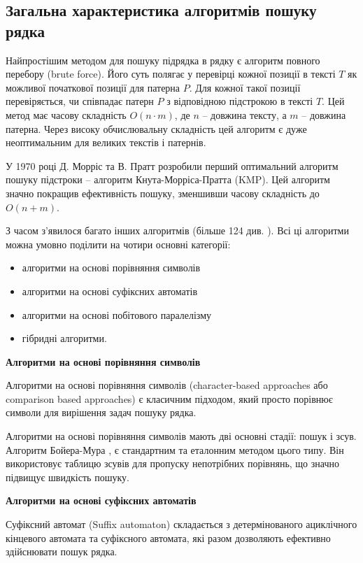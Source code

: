\documentclass[a4paper,14pt]{extarticle} %
\begin{document}
	\subsection{Загальна характеристика алгоритмів пошуку рядка}

	Найпростішим методом для пошуку підрядка в рядку є алгоритм повного перебору (brute force). Його суть полягає у перевірці кожної позиції в тексті \( T \) як можливої початкової позиції для патерна \( P \). Для кожної такої позиції перевіряється, чи співпадає патерн \( P \) з відповідною підстрокою в тексті \( T \). Цей метод має часову складність \( O(n \cdot m) \), де \( n \) – довжина тексту, а \( m \) – довжина патерна. Через високу обчислювальну складність цей алгоритм є дуже неоптимальним для великих текстів і патернів.

	У 1970 році Д. Морріс та В. Пратт \cite{morris-pratt} розробили перший оптимальний алгоритм пошуку підстроки – алгоритм Кнута-Морріса-Пратта (KMP). Цей алгоритм значно покращив ефективність пошуку, зменшивши часову складність до \( O(n + m) \).

	З часом з'явилося багато інших алгоритмів (більше 124 див. \cite{smart}). Всі ці алгоритми можна умовно поділити на чотири основні категорії:
	\begin{itemize}
		\item алгоритми на основі порівняння символів
		\item  алгоритми на основі суфіксних автоматів
		\item алгоритми на основі побітового паралелізму
		\item гібридні алгоритми.
	\end{itemize}

\textbf{Алгоритми на основі порівняння символів}

Алгоритми на основі порівняння символів (character-based approaches або comparison based approaches) є класичним підходом, який просто порівнює символи для вирішення задач пошуку рядка.

Алгоритми на основі порівняння символів мають дві основні стадії: пошук і зсув. Алгоритм Бойера-Мура \cite{bm}, є стандартним та еталонним методом цього типу. Він використовує таблицю зсувів для пропуску непотрібних порівнянь, що значно підвищує швидкість пошуку.

\textbf{Алгоритми на основі суфіксних автоматів}

Суфіксний автомат (Suffix automaton) складається з детермінованого ациклічного кінцевого автомата та суфіксного автомата, які разом дозволяють ефективно здійснювати пошук рядка.
\end{document}
